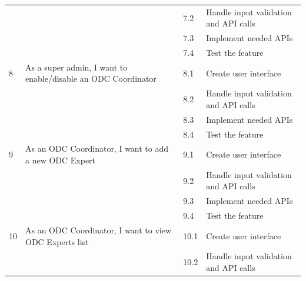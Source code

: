 \begin{longtable}{|p{1cm}|p{7cm}|p{1cm}|p{7cm}|}
                                    &                                                               & 7.2         & Handle input validation and API calls \\ \cline{3-4}
                                    &                                                               & 7.3         & Implement needed APIs                 \\ \cline{3-4}
                                    &                                                               & 7.4         & Test the feature                      \\ \hline
    8                               & As a super admin, I want to enable/disable an ODC Coordinator & 8.1         & Create user interface                 \\ \cline{3-4}
                                    &                                                               & 8.2         & Handle input validation and API calls \\ \cline{3-4}
                                    &                                                               & 8.3         & Implement needed APIs                 \\ \cline{3-4}
                                    &                                                               & 8.4         & Test the feature                      \\ \hline
    9                               & As an ODC Coordinator, I want to add a new ODC Expert         & 9.1         & Create user interface                 \\ \cline{3-4}
                                    &                                                               & 9.2         & Handle input validation and API calls \\ \cline{3-4}
                                    &                                                               & 9.3         & Implement needed APIs                 \\ \cline{3-4}
                                    &                                                               & 9.4         & Test the feature                      \\ \hline
    10                              & As an ODC Coordinator, I want to view ODC Experts list        & 10.1        & Create user interface                 \\ \cline{3-4}
                                    &                                                               & 10.2        & Handle input validation and API calls \\ \cline{3-4}

\end{longtable}
